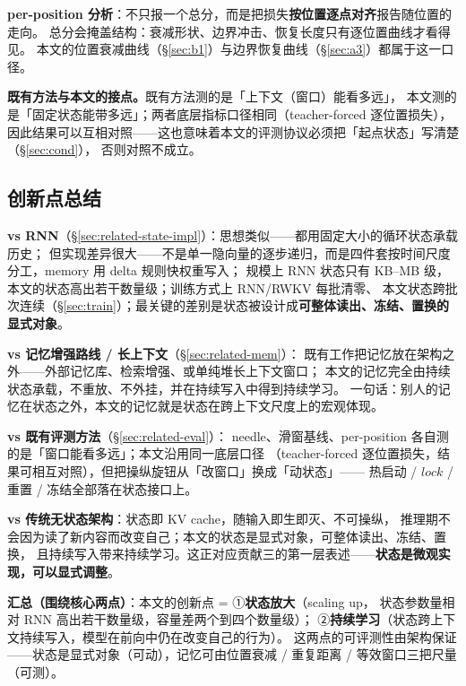 \textbf{per-position 分析}：不只报一个总分，而是把损失\textbf{按位置逐点对齐}报告随位置的走向。
总分会掩盖结构：衰减形状、边界冲击、恢复长度只有逐位置曲线才看得见。
本文的位置衰减曲线（\S\ref{sec:b1}）与边界恢复曲线（\S\ref{sec:a3}）都属于这一口径。

\textbf{既有方法与本文的接点。}既有方法测的是「上下文（窗口）能看多远」，
本文测的是「固定状态能带多远」；两者底层指标口径相同（teacher-forced 逐位置损失），
因此结果可以互相对照——这也意味着本文的评测协议必须把「起点状态」写清楚（\S\ref{sec:cond}），
否则对照不成立。

\subsection{创新点总结}\label{sec:related-innovation}

\textbf{vs RNN}（\S\ref{sec:related-state-impl}）：思想类似——都用固定大小的循环状态承载历史；
但实现差异很大——不是单一隐向量的逐步递归，而是四件套按时间尺度分工，memory 用 delta 规则快权重写入；
规模上 RNN 状态只有 KB--MB 级，本文的状态高出若干数量级；训练方式上 RNN/RWKV 每批清零、
本文状态跨批次连续（\S\ref{sec:train}）；最关键的差别是状态被设计成\textbf{可整体读出、冻结、置换的显式对象}。

\textbf{vs 记忆增强路线 / 长上下文}（\S\ref{sec:related-mem}）：
既有工作把记忆放在架构之外——外部记忆库、检索增强、或单纯堆长上下文窗口；
本文的记忆完全由持续状态承载，不重放、不外挂，并在持续写入中得到持续学习。
一句话：别人的记忆在状态之外，本文的记忆就是状态在跨上下文尺度上的宏观体现。

\textbf{vs 既有评测方法}（\S\ref{sec:related-eval}）：
needle、滑窗基线、per-position 各自测的是「窗口能看多远」；本文沿用同一底层口径
（teacher-forced 逐位置损失，结果可相互对照），但把操纵旋钮从「改窗口」换成「动状态」——
热启动 / $\mathit{lock}$ / 重置 / 冻结全部落在状态接口上。

\textbf{vs 传统无状态架构}：状态即 KV cache，随输入即生即灭、不可操纵，
推理期不会因为读了新内容而改变自己；本文的状态是显式对象，可整体读出、冻结、置换，
且持续写入带来持续学习。这正对应贡献三的第一层表述——\textbf{状态是微观实现，可以显式调整}。

\textbf{汇总（围绕核心两点）}：本文的创新点 = ①\textbf{状态放大}（scaling up，
状态参数量相对 RNN 高出若干数量级，容量差两个到四个数量级）；
②\textbf{持续学习}（状态跨上下文持续写入，模型在前向中仍在改变自己的行为）。
这两点的可评测性由架构保证——状态是显式对象（可动），记忆可由位置衰减 / 重复距离 / 等效窗口三把尺量（可测）。
